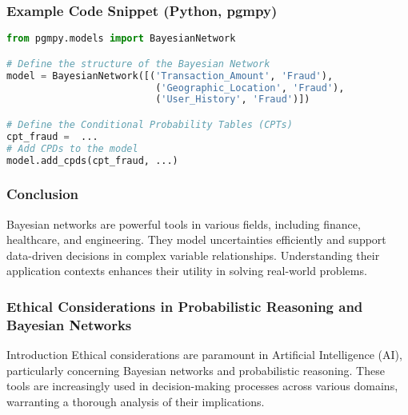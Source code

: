\documentclass[aspectratio=169]{beamer}
\begin{document}
\begin{frame}[fragile]
    \frametitle{Example Code Snippet (Python, pgmpy)}
    \begin{lstlisting}[language=Python]
from pgmpy.models import BayesianNetwork

# Define the structure of the Bayesian Network
model = BayesianNetwork([('Transaction_Amount', 'Fraud'),
                          ('Geographic_Location', 'Fraud'),
                          ('User_History', 'Fraud')])

# Define the Conditional Probability Tables (CPTs)
cpt_fraud =  ...
# Add CPDs to the model
model.add_cpds(cpt_fraud, ...)
    \end{lstlisting}
\end{frame}

\begin{frame}
    \frametitle{Conclusion}
    Bayesian networks are powerful tools in various fields, including finance, healthcare, and engineering. They model uncertainties efficiently and support data-driven decisions in complex variable relationships. Understanding their application contexts enhances their utility in solving real-world problems.
\end{frame}

\begin{frame}[fragile]
    \frametitle{Ethical Considerations in Probabilistic Reasoning and Bayesian Networks}
    \begin{block}{Introduction}
        Ethical considerations are paramount in Artificial Intelligence (AI), particularly concerning Bayesian networks and probabilistic reasoning. These tools are increasingly used in decision-making processes across various domains, warranting a thorough analysis of their implications.
    \end{block}
\end{frame}
\end{document}
